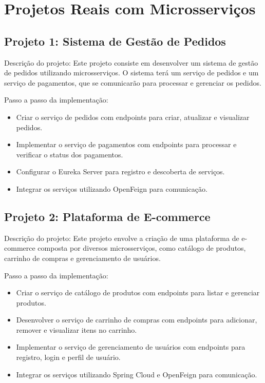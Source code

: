 \documentclass[a4paper,12pt]{book}
\begin{document}
\section{Projetos Reais com Microsserviços}

\subsection{Projeto 1: Sistema de Gestão de Pedidos}
Descrição do projeto:
Este projeto consiste em desenvolver um sistema de gestão de pedidos utilizando microsserviços. O sistema terá um serviço de pedidos e um serviço de pagamentos, que se comunicarão para processar e gerenciar os pedidos.

Passo a passo da implementação:
\begin{itemize}
  \item Criar o serviço de pedidos com endpoints para criar, atualizar e visualizar pedidos.
  \item Implementar o serviço de pagamentos com endpoints para processar e verificar o status dos pagamentos.
  \item Configurar o Eureka Server para registro e descoberta de serviços.
  \item Integrar os serviços utilizando OpenFeign para comunicação.
\end{itemize}

\subsection{Projeto 2: Plataforma de E-commerce}
Descrição do projeto:
Este projeto envolve a criação de uma plataforma de e-commerce composta por diversos microsserviços, como catálogo de produtos, carrinho de compras e gerenciamento de usuários.

Passo a passo da implementação:
\begin{itemize}
  \item Criar o serviço de catálogo de produtos com endpoints para listar e gerenciar produtos.
  \item Desenvolver o serviço de carrinho de compras com endpoints para adicionar, remover e visualizar itens no carrinho.
  \item Implementar o serviço de gerenciamento de usuários com endpoints para registro, login e perfil de usuário.
  \item Integrar os serviços utilizando Spring Cloud e OpenFeign para comunicação.
\end{itemize}
\end{document}
